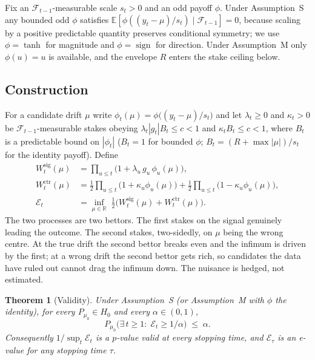 \documentclass{article}
\theoremstyle{plain}
\newtheorem{theorem}{Theorem}
\theoremstyle{definition}
\begin{document}
Fix an $\mathcal{F}_{t-1}$-measurable scale $s_t>0$ and an odd payoff $\phi$. Under
Assumption~S any bounded odd $\phi$ satisfies $\mathbb{E}[\phi((y_t-\mu)/s_t)\mid
\mathcal{F}_{t-1}]=0$, because scaling by a positive predictable quantity preserves
conditional symmetry; we use $\phi=\tanh$ for magnitude and $\phi=\operatorname{sign}$ for
direction. Under Assumption~M only $\phi(u)=u$ is available, and the envelope $R$ enters
the stake ceiling below.

\subsection{Construction}

For a candidate drift $\mu$ write $\phi_t(\mu)=\phi\big((y_t-\mu)/s_t\big)$ and let
$\lambda_t\ge0$ and $\kappa_t>0$ be $\mathcal{F}_{t-1}$-measurable stakes obeying
$\lambda_t|g_t|B_t\le c<1$ and $\kappa_tB_t\le c<1$, where $B_t$ is a predictable bound on
$|\phi_t|$ ($B_t=1$ for bounded $\phi$; $B_t=(R+\max|\mu|)/s_t$ for the identity payoff).
Define
%
\begin{align}
  W^{\mathrm{sig}}_t(\mu) &= \prod_{u\le t}\Big(1+\lambda_u\,g_u\,\phi_u(\mu)\Big),
  \label{eq:wsig}\\[2pt]
  W^{\mathrm{ctr}}_t(\mu) &= \tfrac12\prod_{u\le t}\Big(1+\kappa_u\phi_u(\mu)\Big)
                           + \tfrac12\prod_{u\le t}\Big(1-\kappa_u\phi_u(\mu)\Big),
  \label{eq:wctr}\\[2pt]
  \mathcal{E}_t &= \inf_{\mu\in\mathbb{R}}\;
                   \tfrac12\Big(W^{\mathrm{sig}}_t(\mu)+W^{\mathrm{ctr}}_t(\mu)\Big).
  \label{eq:cert}
\end{align}
%
The two processes are two bettors. The first stakes on the signal genuinely leading the
outcome. The second stakes, two-sidedly, on $\mu$ being the wrong centre. At the true drift
the second bettor breaks even and the infimum is driven by the first; at a wrong drift the
second bettor gets rich, so candidates the data have ruled out cannot drag the infimum
down. The nuisance is hedged, not estimated.

\begin{theorem}[Validity]
\label{thm:validity}
Under Assumption~S (or Assumption~M with $\phi$ the identity), for every $P_{\mu_0}\in H_0$
and every $\alpha\in(0,1)$,
\[
  P_{\mu_0}\Big(\exists\,t\ge1:\;\mathcal{E}_t\ge 1/\alpha\Big)\;\le\;\alpha .
\]
Consequently $1/\sup_{t}\mathcal{E}_t$ is a $p$-value valid at every stopping time, and
$\mathcal{E}_\tau$ is an e-value for any stopping time $\tau$.
\end{theorem}
\end{document}
